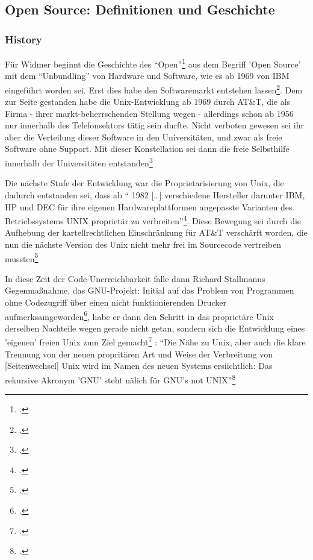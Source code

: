 \documentclass[DIV=calc,BCOR=5mm,11pt,headings=small,oneside,abstract=true, toc=bib]{scrartcl}
\begin{document}
\subsection{Open Source: Definitionen und Geschichte}

\subsubsection{History}

Für Widmer beginnt die Geschichte des
\enquote{Open}\footcite[vgl.][8]{Widmer2003a} aus dem Begriff 'Open Source'
mit dem \enquote{Unbundling} von Hardware und Software, wie es ab 1969 von
IBM eingeführt worden sei. Erst dies habe den Softwaremarkt entstehen
lassen\footcite[vgl.][9]{Widmer2003a}. Dem zur Seite gestanden habe die
Unix-Entwicklung ab 1969 durch AT\&T, die als Firma - ihrer markt-beherrschenden
Stellung wegen - allerdings schon ab 1956 nur innerhalb des Telefonsektors tätig
sein durfte. Nicht verboten gewesen sei ihr aber die Verteilung dieser Software
in den Universitäten, und zwar als freie Software ohne Support. Mit dieser
Konstellation sei dann die freie Selbsthilfe innerhalb der Universitäten
entstanden\footcite[vgl.][10f jener Arbeitsstil, wie von außen zu ergänzen wäre
- in den Stallmann hineingekommen und den er so konstitutiv zu schätzen gelernt
hatte.]{Widmer2003a}

Die nächste Stufe der Entwicklung war die Proprietarisierung von Unix, die
dadurch entstanden sei, dass ab \enquote{ 1982 [\ldots] verschiedene
Hersteller darunter IBM, HP und DEC für ihre eigenen Hardwareplattformen
angepasste Varianten des Betriebssystems UNIX proprietär zu
verbreiten}\footcite[vgl.][12 original zitiert nach Müller:
Die Wurzeln freier Software]{Widmer2003a}. Diese Bewegung sei durch die
Aufhebung der kartellrechtlichen Einschränkung für AT\&T verschärft worden, die
nun die nächste Version des Unix nicht mehr frei im Sourcecode vertreiben
mussten\footcite[vgl.][12]{Widmer2003a}

In diese Zeit der Code-Unerreichbarkeit falle dann Richard Stallmanns
Gegenmaßnahme, das GNU-Projekt: Initial auf das Problem von  Programmen ohne
Codezugriff über einen nicht funktionierenden Drucker
aufmerksamgeworden\footcite[vgl.][13]{Widmer2003a}, habe er dann den Schritt in
das proprietäre Unix derselben Nachteile wegen gerade nicht getan, sondern sich
die Entwicklung eines 'eigenen' freien Unix zum Ziel
gemacht\footcite[vgl.][13]{Widmer2003a} : \enquote{Die Nähe zu Unix, aber auch die
klare Trennung von der neuen propritären Art und Weise der Verbreitung von
[Seitenwechsel] Unix wird im Namen des neuen Systems ersiichtlich: Das rekursive
Akronym 'GNU' steht nälich für GNU's not
UNIX}\footcite[][13f]{Widmer2003a}
\end{document}
